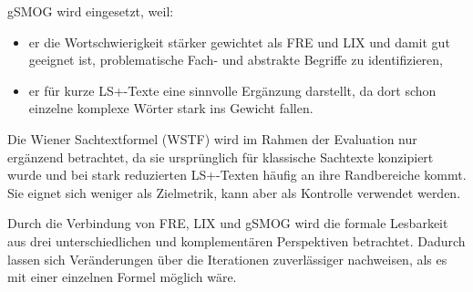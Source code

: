 \begin{itemize}
	gSMOG wird eingesetzt, weil:
	\begin{itemize}
		\item er die Wortschwierigkeit stärker gewichtet als FRE und LIX und damit gut geeignet ist, problematische Fach- und abstrakte Begriffe zu identifizieren,
		\item er für kurze LS+-Texte eine sinnvolle Ergänzung darstellt, da dort schon einzelne komplexe Wörter stark ins Gewicht fallen.
	\end{itemize}
	Die Wiener Sachtextformel (WSTF) wird im Rahmen der Evaluation nur ergänzend betrachtet, da sie ursprünglich für klassische Sachtexte konzipiert wurde und bei stark reduzierten LS+-Texten häufig an ihre Randbereiche kommt.
	Sie eignet sich weniger als Zielmetrik, kann aber als Kontrolle verwendet werden.
\end{itemize}
Durch die Verbindung von FRE, LIX und gSMOG wird die formale Lesbarkeit aus drei unterschiedlichen und komplementären Perspektiven betrachtet.
Dadurch lassen sich Veränderungen über die Iterationen zuverlässiger nachweisen, als es mit einer einzelnen Formel möglich wäre.

